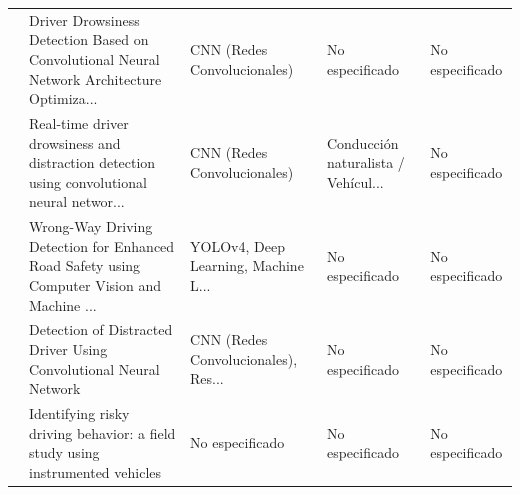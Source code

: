 \begin{table}[htbp]
\begin{tabular}{cp{7.5cm}p{2.8cm}p{2.8cm}p{2.8cm}}
\cite{jebraeily2024drowsiness} & Driver Drowsiness Detection Based on Convolutional Neural Network Architecture Optimiza... & CNN (Redes Convolucionales) & No especificado & No especificado \\
\cite{hernandez2024realtime} & Real-time driver drowsiness and distraction detection using convolutional neural networ... & CNN (Redes Convolucionales) & Conducción naturalista / Vehícul... & No especificado \\
\cite{connie2024wrongway} & Wrong-Way Driving Detection for Enhanced Road Safety using Computer Vision and Machine ... & YOLOv4, Deep Learning, Machine L... & No especificado & No especificado \\
\cite{vamshi2023distracted} & Detection of Distracted Driver Using Convolutional Neural Network & CNN (Redes Convolucionales), Res... & No especificado & No especificado \\
\cite{charly2023identifying} & Identifying risky driving behavior: a field study using instrumented vehicles & No especificado & No especificado & No especificado \\
\bottomrule
\end{tabular}
\end{table}



